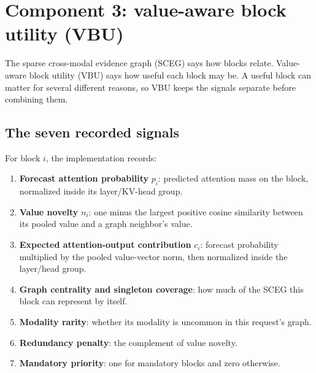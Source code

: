 \documentclass[11pt]{article}
\newcommand{\term}[1]{\textbf{#1}}
\begin{document}
\section{Component 3: value-aware block utility (VBU)}
\label{sec:utility}

The sparse cross-modal evidence graph (SCEG) says how blocks relate. Value-aware block utility
(VBU) says how useful each block may be. A useful block can matter for several different reasons,
so VBU keeps the signals separate before combining them.

\subsection{The seven recorded signals}

For block $i$, the implementation records:

\begin{enumerate}
  \item \term{Forecast attention probability} $p_i$: predicted attention mass on the block,
        normalized inside its layer/KV-head group.
  \item \term{Value novelty} $n_i$: one minus the largest positive cosine similarity between its
        pooled value and a graph neighbor's value.
  \item \term{Expected attention-output contribution} $c_i$: forecast probability multiplied by
        the pooled value-vector norm, then normalized inside the layer/head group.
  \item \term{Graph centrality and singleton coverage}: how much of the SCEG this block can
        represent by itself.
  \item \term{Modality rarity}: whether its modality is uncommon in this request's graph.
  \item \term{Redundancy penalty}: the complement of value novelty.
  \item \term{Mandatory priority}: one for mandatory blocks and zero otherwise.
\end{enumerate}
\end{document}
